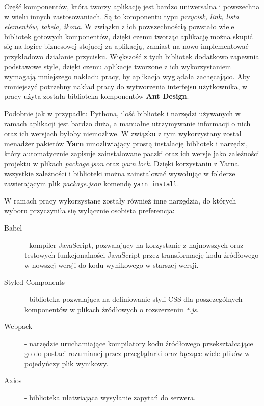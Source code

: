 Częś\'c komponentów, która tworzy aplikację jest bardzo uniwersalna i powszechna w wielu innych zastosowaniach.
Są to komponentu typu \textit{przycisk, link, lista elementów, tabela, ikona}. W związku z ich powszechnością
powstało wiele bibliotek gotowych komponentów, dzięki czemu tworząc aplikację można skupi\'c się na logice
biznesowej stojącej za aplikacją, zamiast na nowo implementowa\'c przykładowo działanie przycisku. Większoś\'c
z tych bibliotek dodatkowo zapewnia podstawowe style, dzięki czemu aplikacje tworzone z ich wykorzystaniem
wymagają mniejszego nakładu pracy, by aplikacja wyglądała zachęcająco. Aby zmniejszy\'c potrzebny nakład
pracy do wytworzenia interfejsu użytkownika, w pracy użyta została biblioteka komponentów \textbf{Ant Design}.
\newline

Podobnie jak w przypadku Pythona, iloś\'c bibliotek i narzędzi używanych w ramach aplikacji jest bardzo duża,
a manualne utrzymywanie informacji o nich oraz ich wersjach byłoby niemożliwe. W związku z tym wykorzystany
został menadżer pakietów \textbf{Yarn} umożliwiający prostą instalację bibliotek i narzędzi, który automatycznie
zapisuje zainstalowane paczki oraz ich wersje jako zależności projektu w plikach \textit{package.json} oraz
\textit{yarn.lock}. Dzięki korzystaniu z Yarna wszystkie zależności i biblioteki można zainstalowa\'c wywołując
w folderze zawierającym plik \textit{package.json} komendę \texttt{yarn install}.

W ramach pracy wykorzystane zostały również inne narzędzia, do których wyboru przyczyniła się wyłącznie
osobista preferencja:

\begin{description}
  \item[Babel] - kompiler JavaScript, pozwalający na korzystanie z najnowszych oraz testowych funkcjonalności
  JavaScript przez transformację kodu \'zródłowego w nowszej wersji do kodu wynikowego w starszej wersji.
  \item[Styled Components] - biblioteka pozwalająca na definiowanie styli CSS dla poszczególnych komponentów
  w plikach \'zródłowych o rozszerzeniu \textit{*.js}.
  \item[Webpack] - narzędzie uruchamiające kompilatory kodu \'zródłowego przekształcające go do postaci rozumianej
  przez przeglądarki oraz łączące wiele plików w pojedyńczy plik wynikowy.
  \item[Axios] - biblioteka ułatwiająca wysyłanie zapytań do serwera.
\end{description}

